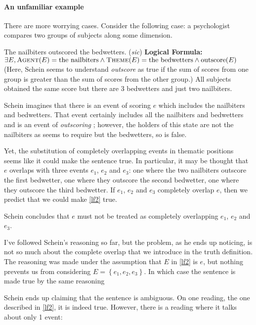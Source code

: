 \paragraph{An unfamiliar example}
There are more worrying cases. Consider the following case: a psychologist compares two groups of subjects along some dimension. 

\pex
\a The nailbiters outscored the bedwetters. (\emph{sic})
\a \textbf{Logical Formula:}\\
$\exists E, \textsc{Agent}(E)=\text{the nailbiters} \wedge \textsc{Theme}(E)=\text{the bedwetters} \wedge \text{outscore}(E)$ \label{lf2}
\xe
%
(Here, Schein seems to understand \emph{outscore} as true if the sum of scores from one group is greater than the sum of scores from the other group.) All subjects obtained the same score but there are 3 bedwetters and just two nailbiters. 

Schein imagines that there is an event of scoring $e$ which includes the nailbiters and bedwetters. That event certainly includes all the nailbiters and bedwetters and is an event of \emph{outscoring} ; however, the holders of this state are not the nailbiters as \clastx seems to require but the bedwetters, so \clastx is false.


Yet, the substitution of completely overlapping events in thematic positions seems like it could make the sentence true. In particular, it may be thought that $e$ overlaps
with three events $e_1$, $e_2$ and $e_3$: one where the two nailbiters outscore the first bedwetter, one where they outscore the second bedwetter, one where they outscore the third bedwetter. If $e_1$, $e_2$ and $e_3$ completely overlap $e$, then we predict that we could make \cref{lf2} true.

Schein concludes that $e$ must not be treated as completely overlapping $e_1$, $e_2$ and $e_3$.

I've followed Schein's reasoning so far, but the problem, as he ends up noticing, is not so much about the complete overlap that we introduce in the truth definition. The reasoning was made under the assumption that $E$ in  \cref{lf2} is $e$, but nothing prevents us from considering $E=\left\lbrace e_1, e_2, e_3 \right\rbrace$. In which case the sentence is made true by the same reasoning

Schein ends up claiming that the sentence is ambiguous. On one reading, the one described in \cref{lf2}, it is indeed true. However, there is a  reading where it talks about only 1 event:

